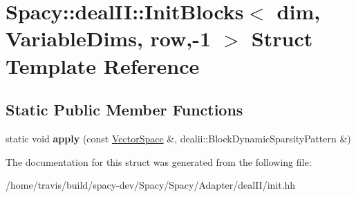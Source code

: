 \hypertarget{structSpacy_1_1dealII_1_1InitBlocks_3_01dim_00_01VariableDims_00_01row_00-1_01_4}{\section{Spacy\-:\-:deal\-I\-I\-:\-:Init\-Blocks$<$ dim, Variable\-Dims, row,-\/1 $>$ Struct Template Reference}
\label{structSpacy_1_1dealII_1_1InitBlocks_3_01dim_00_01VariableDims_00_01row_00-1_01_4}
}
\subsection*{Static Public Member Functions}
\begin{DoxyCompactItemize}
\item 
\hypertarget{structSpacy_1_1dealII_1_1InitBlocks_3_01dim_00_01VariableDims_00_01row_00-1_01_4_af03542874eb72a5a0415dbeff9486e10}{static void {\bfseries apply} (const \hyperlink{classSpacy_1_1VectorSpace}{Vector\-Space} \&, dealii\-::\-Block\-Dynamic\-Sparsity\-Pattern \&)}\label{structSpacy_1_1dealII_1_1InitBlocks_3_01dim_00_01VariableDims_00_01row_00-1_01_4_af03542874eb72a5a0415dbeff9486e10}

\end{DoxyCompactItemize}


The documentation for this struct was generated from the following file\-:\begin{DoxyCompactItemize}
\item 
/home/travis/build/spacy-\/dev/\-Spacy/\-Spacy/\-Adapter/deal\-I\-I/init.\-hh\end{DoxyCompactItemize}
